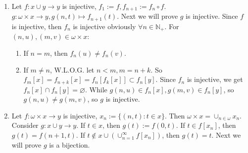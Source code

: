 \documentclass{ctexart}
\begin{document}
\begin{solution}
    \begin{enumerate}
        \item Let $f:x\cup y\to y$ is injective, $f_1:=f,f_{n+1}:=f_n\circ f$. $g:\omega\times x\to y,g(n,t)\mapsto f_{n+1}(t)$. Next we will prove $g$ is injective. Since $f$ is injective, then $f_n$ is injective obviously $\forall n\in \mathbb{N}_+$. For $(n,u),(m,v)\in \omega\times x$:
        \begin{enumerate}
            \item If $n=m$, then $f_n(u)\neq f_n(v)$.
            \item If $m\neq n$, W.L.O.G. let $n< m,m=n+k$. So $f_m[x]=f_{n+k}[x]=f_n[f_k[x]]\subset f_n[y]$. Since $f_n$ is injective, we get $f_n[x]\cap f_n[y]=\varnothing$. While $g(n,u)\in f_n[x], g(m,v)\in f_n[y]$, so $g(n,u)\neq g(m,v)$, so $g$ is injective.
        \end{enumerate}
        \item Let $f:\omega\times x\to y$ is injective, $x_n:=\{(n,t):t\in x\}$. Then $\omega\times x=\cup_{n\in \omega}x_n$. Consider $g:x\cup y\to y$. If $t\in x$, then $g(t):=f(0,t)$. If $t\in f[x_n]$, then $g(t)=f(n+1,t)$. If $t\notin x\cup (\cup_{n=1}^{\infty} f[x_n])$, then $g(t)=t$. Next we will prove $g$ is a bijection. 
        

\end{enumerate}
\end{solution}
\end{document}
